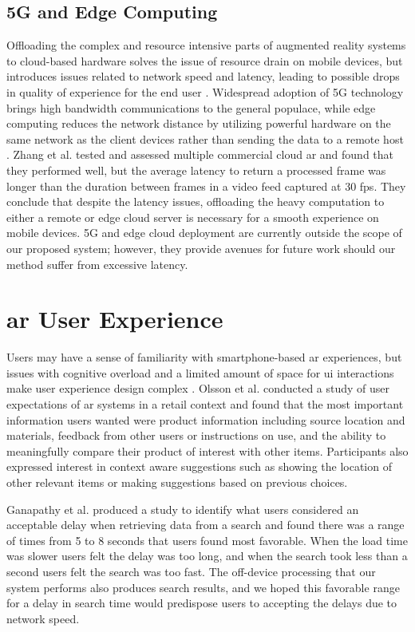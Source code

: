 \documentclass[thesis]{fputhesis}
\begin{document}
\begin{body}
\subsection{5G and Edge Computing}
Offloading the complex and resource intensive parts of augmented reality systems to cloud-based hardware solves the issue of resource drain on mobile devices, but introduces issues related to network speed and latency, leading to possible drops in 
quality of experience for the end user \cite{zhang_networking_2017}. Widespread adoption of 5G technology brings high bandwidth communications to the general populace, while edge computing reduces the network distance by utilizing powerful hardware on the
same network as the client devices rather than sending the data to a remote host \cite{qiao_web_2019}. Zhang et al. \cite{zhang_networking_2017} tested and assessed multiple commercial cloud \acrshort{ar}  and found that they performed well, but the average latency to return a processed frame was longer than the duration between frames in a video feed captured at 30 \acrfull{fps}. They conclude that despite the latency issues, offloading the heavy computation to either a remote or edge cloud server is necessary for a smooth experience on mobile devices. 5G and edge cloud deployment are currently outside the scope of our proposed system; however, they provide avenues for future work should our method suffer from excessive latency. 

\section{\acrshort{ar} User Experience}
Users may have a sense of familiarity with smartphone-based \acrshort{ar} experiences, but issues with cognitive overload and a limited amount of space for \acrfull{ui} interactions make user experience design complex \cite{kourouthanassis_demystifying_2015}. Olsson et al. \cite{olsson_expected_2013} conducted a study of user expectations of \acrshort{ar} systems in a retail context and found that the most important information users wanted were 
product information including source location and materials, feedback from other users or instructions on use, and the ability to meaningfully compare their product of interest with other items. Participants also expressed interest in context aware suggestions such as showing the location of other relevant items or making suggestions based on previous choices. 

Ganapathy et al. \cite{ganapathy_mar_2011} produced a study to identify what users considered an acceptable delay when retrieving data from a search and found there was a range of times from 5 to 8 seconds that users found most favorable. When the load time was slower users felt the delay was too long, and when the search took less than a second users felt the search was too fast. The off-device processing that our system performs also produces search results, and we hoped this favorable range for a delay in search time would predispose users to accepting the delays due to network speed. 


\end{body}
\end{document}

